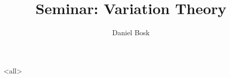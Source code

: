 \documentclass[ignoreframetext]{beamer}
\begin{document}
\title{%
  Seminar: Variation Theory
}
\author{Daniel Bosk}

\begin{frame}
  \maketitle
\end{frame}

\mode<all>

\mode*

\begin{frame}[allowframebreaks]
  \printbibliography
\end{frame}
\end{document}
